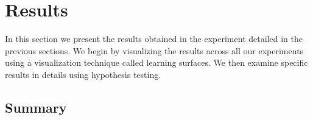 \chapter{Results}
In this section we present the results obtained in the experiment detailed in the previous sections. We begin by visualizing the results across all our experiments using a visualization technique called learning surfaces. We then examine specific results in details using hypothesis testing.



\section{Summary}
